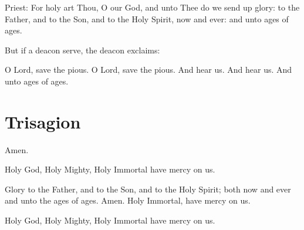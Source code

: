 \begin{liturgicaltext}
    \priest Priest: For holy art Thou, O our God, and unto Thee do we send up glory: to the Father, and to the Son, and to the Holy Spirit, now and ever:  and unto ages of ages.
\end{liturgicaltext}

\begin{rubricsection}

\begin{rubricmed}
    But if a deacon serve, the deacon exclaims:
\end{rubricmed}

\begin{liturgicaltext}
    \deacon O Lord, save the pious.
    \choir O Lord, save the pious.
    \deacon And hear us.
    \choir And hear us.
    \deacon And unto ages of ages.
\end{liturgicaltext}

\end{rubricsection}

\section{Trisagion}

\begin{hymn}
    Amen.
    
    Holy God, Holy Mighty, Holy Immortal have mercy on us. 
    
    Glory to the Father, and to the Son, and to the Holy Spirit; both now and ever and unto the ages of ages. Amen. Holy Immortal, have mercy on us.

    Holy God, Holy Mighty, Holy Immortal have mercy on us.

\end{hymn}